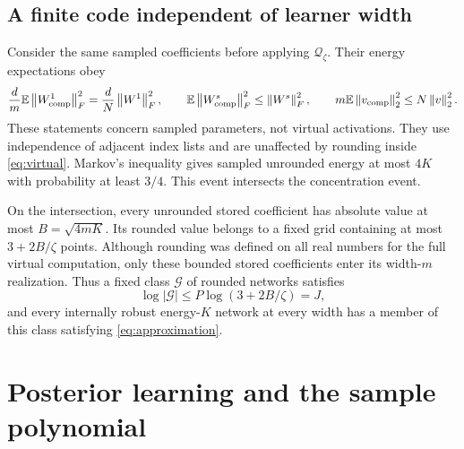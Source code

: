\documentclass[11pt]{article}
\newcommand{\E}{\mathbb E}
\newcommand{\norm}[1]{\left\|#1\right\|}
\begin{document}
\subsection{A finite code independent of learner width}
Consider the same sampled coefficients before applying
$\mathcal Q_\zeta$. Their energy expectations obey
\[
 \frac dm\E\norm{W^1_{\rm comp}}_F^2
   =\frac dN\norm{W^1}_F^2,\qquad
 \E\norm{W^s_{\rm comp}}_F^2\le\norm{W^s}_F^2,\qquad
 m\E\norm{v_{\rm comp}}_2^2\le N\norm v_2^2.
\]
These statements concern sampled parameters, not virtual activations.
They use independence of adjacent index lists and are unaffected by
rounding inside \eqref{eq:virtual}. Markov's inequality gives sampled
unrounded energy at most $4K$ with probability at least $3/4$.
This event intersects the concentration event.

On the intersection, every unrounded stored coefficient has absolute value
at most $B=\sqrt{4mK}$. Its rounded value belongs to a fixed grid containing
at most $3+2B/\zeta$ points. Although rounding was defined on all real
numbers for the full virtual computation, only these bounded stored
coefficients enter its width-$m$ realization. Thus a fixed class
$\mathcal G$ of rounded networks satisfies
\begin{equation}\label{eq:code}
 \log|\mathcal G|\le P\log(3+2B/\zeta)=J,
\end{equation}
and every internally robust energy-$K$ network at every width has a member
of this class satisfying \eqref{eq:approximation}.

\section{Posterior learning and the sample polynomial}
\end{document}
